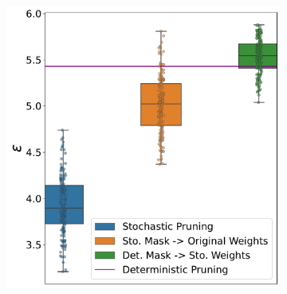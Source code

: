 \begin{figure}[!htb]
\begin{subfigure}[b]{0.65\columnwidth}
   \includegraphics[width=\columnwidth]{figures/epsilon_allN_all_pr_0.8_sigma=0.001.pdf}
   

\end{subfigure}
\end{figure}
